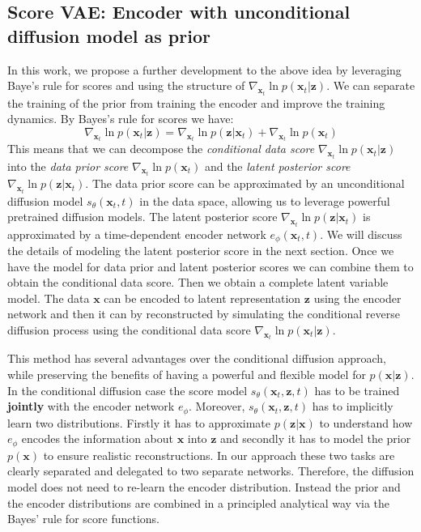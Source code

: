 \subsection{Score VAE: Encoder with unconditional diffusion model as prior}
In this work, we propose a further development to the above idea by leveraging Baye's rule for scores and using the structure of $\nabla_{\textbf{x}_t}  \ln{p(\textbf{x}_t | \textbf{z})}$. We can separate the training of the prior from training the encoder and improve the training dynamics.
By  Bayes's rule for scores we have:
\begin{equation*}
    \nabla_{\textbf{x}_t}  \ln{p(\textbf{x}_t | \textbf{z})} =  \nabla_{\textbf{x}_t}  \ln{p(\textbf{z} | \textbf{x}_t )} + \nabla_{\textbf{x}_t}  \ln{p(\textbf{x}_t)} 
\end{equation*}
This means that we can decompose the \textit{conditional data score} $\nabla_{\textbf{x}_t}  \ln{p(\textbf{x}_t | \textbf{z})} $ into the \textit{data prior score} $\nabla_{\textbf{x}_t}  \ln{p(\textbf{x}_t)} $ and the \textit{latent posterior score} $\nabla_{\textbf{x}_t}  \ln{p(\textbf{z} | \textbf{x}_t )}$. The data prior score can be approximated by an unconditional diffusion model $s_\theta(\textbf{x}_t,t)$ in the data space, allowing us to leverage powerful pretrained diffusion models. The latent posterior score $ \nabla_{\textbf{x}_t}  \ln{p(\textbf{z} | \textbf{x}_t )}$ is approximated by a time-dependent encoder network $e_\phi(\textbf{x}_t, t)$. We will discuss the details of modeling the latent posterior score in the next section. Once we have the model for data prior and latent posterior scores we can combine them to obtain the conditional data score. Then we obtain a complete latent variable model. The data $\textbf{x}$ can be encoded to latent representation $\textbf{z}$ using the encoder network and then it can by reconstructed by simulating the conditional reverse diffusion process using the conditional data score $\nabla_{\textbf{x}_t}  \ln{p(\textbf{x}_t | \textbf{z})}$.

This method has several advantages over the conditional diffusion approach, while preserving the benefits of having a powerful and flexible model for $p(\textbf{x}| \textbf{z})$.  In the conditional diffusion case the score model $s_\theta(\textbf{x}_t, \textbf{z},t)$ has to be trained \textbf{jointly} with the encoder network $e_\phi$. Moreover,  $s_\theta(\textbf{x}_t, \textbf{z},t)$  has to implicitly learn two distributions. Firstly it has to approximate $p( \textbf{z}| \textbf{x})$ to understand how $e_\phi$ encodes the information about $\textbf{x}$ into $\textbf{z}$ and secondly it has to model the prior $p(\textbf{x})$ to ensure realistic reconstructions. In our approach these two tasks are clearly separated and delegated to two separate networks. Therefore, the diffusion model does not need to re-learn the encoder distribution. Instead the prior and the encoder distributions are combined in a principled analytical way via the Bayes' rule for score functions. 

